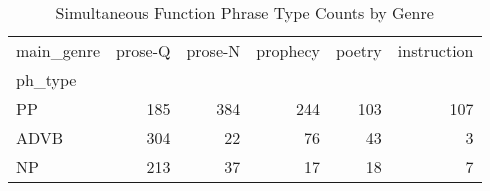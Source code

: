 \begin{table}[htbp!]
\centering
\caption{Simultaneous Function Phrase Type Counts by Genre}
\label{table:simgenph_ct}
\begin{tabular}{lrrrrr}
\toprule
main\_genre &  prose-Q &  prose-N &  prophecy &  poetry &  instruction \\
ph\_type &          &          &           &         &              \\
\midrule
PP      &      185 &      384 &       244 &     103 &          107 \\
ADVB    &      304 &       22 &        76 &      43 &            3 \\
NP      &      213 &       37 &        17 &      18 &            7 \\
\bottomrule
\end{tabular}
\end{table}
